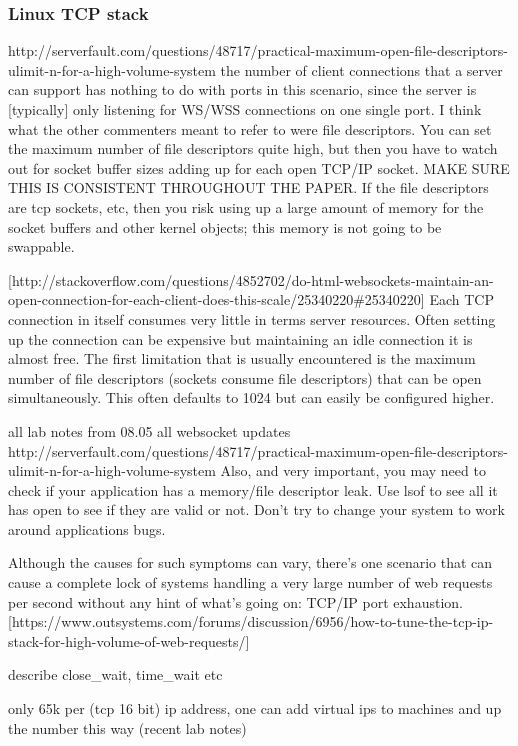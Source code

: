 \documentclass{uvamscse}
\begin{document}
\subsubsection{Linux TCP stack}

http://serverfault.com/questions/48717/practical-maximum-open-file-descriptors-ulimit-n-for-a-high-volume-system
the number of client connections that a server can support has nothing to do with ports in this scenario, since the server is [typically] only listening for WS/WSS connections on one single port. I think what the other commenters meant to refer to were file descriptors. You can set the maximum number of file descriptors quite high, but then you have to watch out for socket buffer sizes adding up for each open TCP/IP socket.  MAKE SURE THIS IS CONSISTENT THROUGHOUT THE PAPER.
If the file descriptors are tcp sockets, etc, then you risk using up a large amount of memory for the socket buffers and other kernel objects; this memory is not going to be swappable.

[http://stackoverflow.com/questions/4852702/do-html-websockets-maintain-an-open-connection-for-each-client-does-this-scale/25340220\#25340220]
Each TCP connection in itself consumes very little in terms server resources. Often setting up the connection can be expensive but maintaining an idle connection it is almost free. The first limitation that is usually encountered is the maximum number of file descriptors (sockets consume file descriptors) that can be open simultaneously. This often defaults to 1024 but can easily be configured higher.

all lab notes from 08.05
all websocket updates
http://serverfault.com/questions/48717/practical-maximum-open-file-descriptors-ulimit-n-for-a-high-volume-system
Also, and very important, you may need to check if your application has a memory/file descriptor leak. Use lsof to see all it has open to see if they are valid or not. Don't try to change your system to work around applications bugs.

Although the causes for such symptoms can vary, there's one scenario that can cause a complete lock of systems handling a very large number of web requests per second without any hint of what's going on: TCP/IP port exhaustion. [https://www.outsystems.com/forums/discussion/6956/how-to-tune-the-tcp-ip-stack-for-high-volume-of-web-requests/]

describe close\_wait, time\_wait etc

only 65k per (tcp 16 bit) ip address, one can add virtual ips to machines and up the number this way
(recent lab notes)
\end{document}
